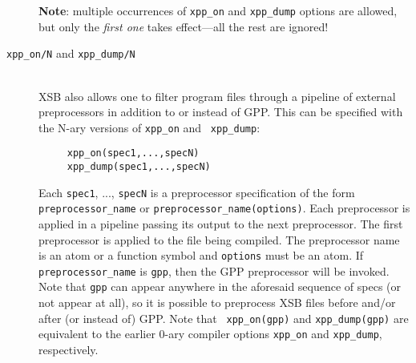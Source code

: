 \begin{description}
  {\bf Note}: multiple occurrences of {\tt xpp\_on} and {\tt xpp\_dump}
  options are allowed, but only the \emph{first one} takes effect---all the
  rest are ignored!  


\item[{\tt xpp\_on/N} and {\tt xpp\_dump/N}]
  ~\\
  XSB also allows one to filter program files through a pipeline of external
  preprocessors in addition to or instead of GPP.
  This can be specified with the N-ary versions of {\tt xpp\_on} and {\tt
    xpp\_dump}:
\begin{verbatim}
     xpp_on(spec1,...,specN)  
     xpp_dump(spec1,...,specN)  
\end{verbatim}
  Each {\tt spec1}, ..., {\tt specN} is a preprocessor specification of
  the form {\tt preprocessor\_name} or {\tt preprocessor\_name(options)}.
  Each preprocessor is applied in a pipeline passing its output to the next
  preprocessor. The first preprocessor is applied to the file being
  compiled.
  The preprocessor name is an atom or a function symbol and {\tt options}
  must be an atom. If {\tt preprocessor\_name} is {\tt gpp}, then the GPP
  preprocessor will be invoked. Note that {\tt gpp} can appear anywhere in
  the aforesaid sequence of specs (or not appear at all), so it is possible to preprocess
  XSB files before and/or after (or instead of) GPP. Note that {\tt
    xpp\_on(gpp)}  and {\tt xpp\_dump(gpp)} are equivalent to the earlier
  0-ary compiler options {\tt xpp\_on}
  and {\tt xpp\_dump}, respectively. 


\end{description}
